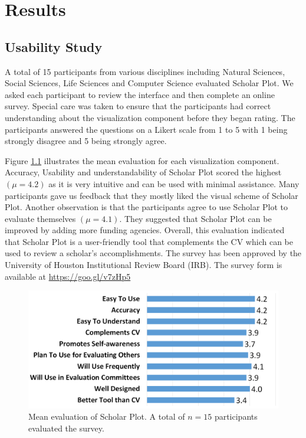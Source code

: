 \chapter{Results}\label{chap:Results}
\section{Usability Study}

A total of 15 participants from various disciplines including Natural Sciences, Social Sciences, Life Sciences and Computer Science evaluated Scholar Plot. We asked each participant to review the interface and then complete an online survey. Special care was taken to ensure that the participants had correct understanding about the visualization component before they began rating. The participants answered the questions on a Likert scale from 1 to 5 with 1 being strongly disagree and 5 being strongly agree.

Figure \ref{fig:UserStudy} illustrates the mean evaluation for each visualization component. Accuracy, Usability and understandability of Scholar Plot scored the highest $(\mu = 4.2)$ as it is very intuitive and can be used with minimal assistance. Many participants gave us feedback that they mostly liked the visual scheme of Scholar Plot. Another observation is that the participants agree to use Scholar Plot to evaluate themselves $(\mu = 4.1)$. They suggested that Scholar Plot can be improved by adding more funding agencies. Overall, this evaluation indicated that Scholar Plot is a user-friendly tool that complements the CV which can be used to review a scholar's accomplishments. The survey has been approved by the University of Houston Institutional Review Board (IRB). The survey form is available at \url{https://goo.gl/v7zHp5}
 
 \begin{figure}
  \centering
  \includegraphics[width=\columnwidth]{figures/fig_survey_chart}
  \caption{Mean evaluation of Scholar Plot. A total of $n=15$ participants evaluated the survey.}
  \label{fig:UserStudy} 
\end{figure}


